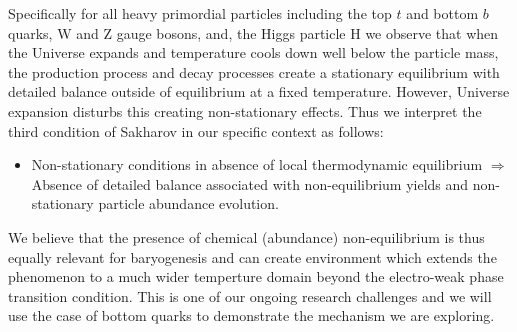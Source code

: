Specifically for all heavy primordial particles including the top $t$ and bottom $b$ quarks, W and Z gauge bosons, and, the Higgs particle H we observe that when the Universe expands and temperature cools down well below the particle mass, the production process and decay processes create a stationary equilibrium with detailed balance outside of equilibrium at a fixed temperature. However, Universe expansion disturbs this creating non-stationary effects. Thus we interpret the third condition of Sakharov in our specific context as follows:
\begin{itemize}
\item Non-stationary conditions in absence of local thermodynamic equilibrium $\Longrightarrow$  Absence of detailed balance associated with non-equilibrium yields and non-stationary particle abundance evolution.
\end{itemize} 
We believe that the presence of chemical (abundance) non-equilibrium is thus equally relevant for baryogenesis and can create environment which extends the phenomenon to a much wider temperture domain  beyond the electro-weak phase transition condition. This is one of our ongoing research challenges and we will use the case of bottom quarks to demonstrate the mechanism we are exploring.

